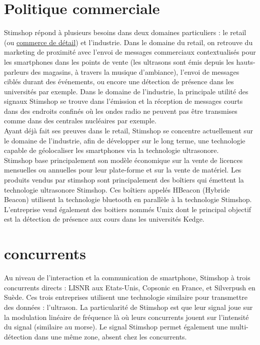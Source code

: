 \documentclass[12pt]{report}
\begin{document}
	\section{Politique commerciale}

Stimshop répond à plusieurs besoins dans deux domaines particuliers : le retail (ou \href{https://www.insee.fr/fr/metadonnees/definition/c1647}{commerce de détail}) et l'industrie.  Dans le domaine du retail, on retrouve du marketing de proximité avec l'envoi de messages commerciaux contextualisés pour les smartphones dans les points de vente (les ultrasons sont émis depuis les hauts-parleurs des magasins, à travers la musique d'ambiance), l'envoi de messages ciblés durant des événements, ou encore une détection de présence dans les universités par exemple. Dans le domaine de l'industrie, la principale utilité des signaux Stimshop se trouve dans l'émission et la réception de messages courts dans des endroits confinés où les ondes radio ne peuvent pas être transmises comme dans des centrales nucléaires par exemple. \\

Ayant déjà fait ses preuves dans le retail, Stimshop se concentre actuellement sur le domaine de l'industrie, afin de développer sur le long terme, une technologie capable de géolocaliser les smartphones via la technologie ultrasonore. \\

Stimshop base principalement son modèle économique sur la vente de licences mensuelles ou annuelles pour leur plate-forme et sur la vente de matériel. Les produits vendus par stimshop sont principalement des boîtiers qui émettent la technologie ultrasonore Stimshop. Ces boîtiers appelés HBeacon (Hybride Beacon) utilisent la technologie bluetooth en parallèle à la technologie Stimshop. L'entreprise vend également des boitiers nommés Umix dont le principal objectif est la détection de présence aux cours dans les universités Kedge. 

	\section{concurrents}

Au niveau de l'interaction et la communication de smartphone, Stimshop à trois concurrents directs : LISNR aux Etats-Unis, Copsonic en France, et Silverpush en Suède. Ces trois entreprises utilisent une technologie similaire pour transmettre des données : l'ultrason. La particularité de Stimshop est que leur signal joue sur la modulation linéaire de fréquence là où leurs concurrents jouent sur l'intensité du signal (similaire au morse). Le signal Stimshop permet également une multi-détection dans une même zone, absent chez les concurrents. 
\end{document}
